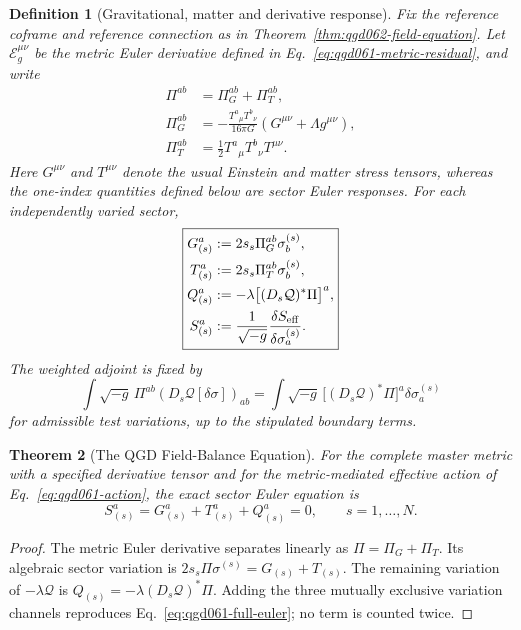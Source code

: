 \documentclass[11pt,a4paper]{article}
\newtheorem{theorem}{Theorem}[section]
\newtheorem{definition}[theorem]{Definition}
\begin{document}
\begin{definition}[Gravitational, matter and derivative response]
\label{def:qgd062-GTQ}
Fix the reference coframe and reference connection as in
Theorem~\ref{thm:qgd062-field-equation}. Let
$\mathcal E_g^{\mu\nu}$ be the metric Euler derivative defined in
Eq.~\eqref{eq:qgd061-metric-residual}, and write
\begin{align}\label{eq:qgd062-pi-split}
\Pi^{ab}&=\Pi_G^{ab}+\Pi_T^{ab},\\
\Pi_G^{ab}&=-\frac{T^a{}_{\mu}T^b{}_{\nu}}{16\pi G}
 (G^{\mu\nu}+\Lambda g^{\mu\nu}),\nonumber\\
\Pi_T^{ab}&=\frac12T^a{}_{\mu}T^b{}_{\nu}T^{\mu\nu}.
\nonumber
\end{align}
Here $G^{\mu\nu}$ and $T^{\mu\nu}$ denote the usual Einstein and
matter stress tensors, whereas the one-index quantities defined below
are \emph{sector Euler responses}. For each independently varied sector,
\begin{equation}\label{eq:qgd062-channels}
\boxed{\begin{aligned}
G_{(s)}^{a}&:=2s_s\Pi_G^{ab}\sigma_b^{(s)},\\
T_{(s)}^{a}&:=2s_s\Pi_T^{ab}\sigma_b^{(s)},\\
Q_{(s)}^{a}&:=-\lambda\big[(D_s\mathcal Q)^*\Pi\big]^a,\\
S_{(s)}^{a}&:=\frac1{\sqrt{-g}}
\frac{\delta S_{\rm eff}}{\delta\sigma_a^{(s)}}.
\end{aligned}}
\end{equation}
The weighted adjoint is fixed by
\[
\int\sqrt{-g}\,\Pi^{ab}(D_s\mathcal Q[\delta\sigma])_{ab}
=\int\sqrt{-g}\,\big[(D_s\mathcal Q)^*\Pi\big]^a
\delta\sigma_a^{(s)}
\]
for admissible test variations, up to the stipulated boundary terms.
\end{definition}

\begin{theorem}[The QGD Field-Balance Equation]
\label{thm:qgd062-field-balance}
For the complete master metric with a specified derivative tensor and
for the metric-mediated effective action of
Eq.~\eqref{eq:qgd061-action}, the exact sector Euler equation is
\begin{equation}\label{eq:qgd062-beautiful-balance}
\boxed{\displaystyle
S_{(s)}^{a}=G_{(s)}^{a}+T_{(s)}^{a}+Q_{(s)}^{a}=0,
\qquad s=1,\ldots,N.}
\end{equation}
\end{theorem}
\begin{proof}
The metric Euler derivative separates linearly as
$\Pi=\Pi_G+\Pi_T$. Its algebraic sector variation is
$2s_s\Pi\sigma^{(s)}=G_{(s)}+T_{(s)}$.
The remaining variation of $-\lambda\mathcal Q$ is
$Q_{(s)}=-\lambda(D_s\mathcal Q)^*\Pi$.
Adding the three mutually exclusive variation channels reproduces
Eq.~\eqref{eq:qgd061-full-euler}; no term is counted twice.
\end{proof}
\end{document}
